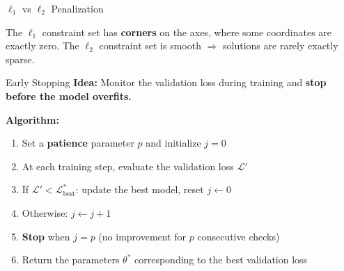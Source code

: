 \documentclass[aspectratio=169]{beamer}
\begin{document}
%
%
\begin{frame}{$\ell_1$ vs $\ell_2$ Penalization}
\begin{center}
\end{center}

\vspace{0.3cm}

The $\ell_1$ constraint set has \textbf{corners} on the axes, where some coordinates are exactly zero. The $\ell_2$ constraint set is smooth $\Rightarrow$ solutions are rarely exactly sparse.
\end{frame}
%
%
\begin{frame}{Early Stopping}
\textbf{Idea:} Monitor the validation loss during training and \textbf{stop before the model overfits.}

\medskip
\textbf{Algorithm:}
\begin{enumerate}
    \item Set a \textbf{patience} parameter $p$ and initialize $j = 0$
    \item At each training step, evaluate the validation loss $\mathcal{L}'$
    \item If $\mathcal{L}' < \mathcal{L}^*_{\text{best}}$: update the best model, reset $j \leftarrow 0$
    \item Otherwise: $j \leftarrow j + 1$
    \item \textbf{Stop} when $j = p$ (no improvement for $p$ consecutive checks)
    \item Return the parameters $\theta^*$ corresponding to the best validation loss
\end{enumerate}
\end{frame}
%
%
\end{document}
